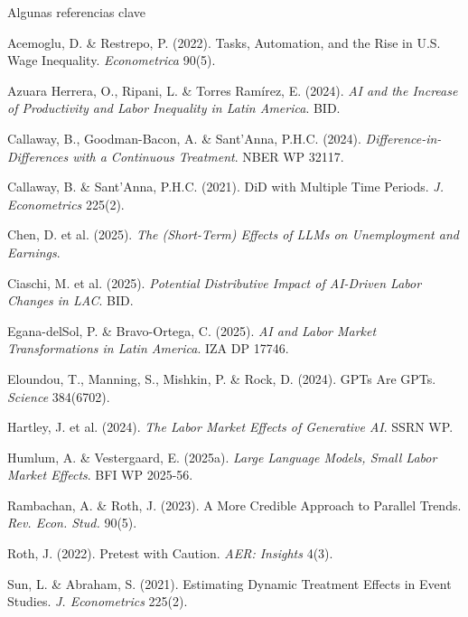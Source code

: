 \documentclass[aspectratio=169,11pt]{beamer}
\begin{document}
\begin{frame}{Algunas referencias clave}
\scriptsize
\setlength{\parskip}{0.30em}

Acemoglu, D. \& Restrepo, P. (2022). Tasks, Automation, and the Rise in U.S. Wage Inequality. \emph{Econometrica} 90(5).

Azuara Herrera, O., Ripani, L. \& Torres Ramírez, E. (2024). \emph{AI and the Increase of Productivity and Labor Inequality in Latin America}. BID.

Callaway, B., Goodman-Bacon, A. \& Sant'Anna, P.H.C. (2024). \emph{Difference-in-Differences with a Continuous Treatment}. NBER WP 32117.

Callaway, B. \& Sant'Anna, P.H.C. (2021). DiD with Multiple Time Periods. \emph{J. Econometrics} 225(2).

Chen, D. et al. (2025). \emph{The (Short-Term) Effects of LLMs on Unemployment and Earnings}.

Ciaschi, M. et al. (2025). \emph{Potential Distributive Impact of AI-Driven Labor Changes in LAC}. BID.

Egana-delSol, P. \& Bravo-Ortega, C. (2025). \emph{AI and Labor Market Transformations in Latin America}. IZA DP 17746.

Eloundou, T., Manning, S., Mishkin, P. \& Rock, D. (2024). GPTs Are GPTs. \emph{Science} 384(6702).

Hartley, J. et al. (2024). \emph{The Labor Market Effects of Generative AI}. SSRN WP.

Humlum, A. \& Vestergaard, E. (2025a). \emph{Large Language Models, Small Labor Market Effects}. BFI WP 2025-56.

Rambachan, A. \& Roth, J. (2023). A More Credible Approach to Parallel Trends. \emph{Rev. Econ. Stud.} 90(5).

Roth, J. (2022). Pretest with Caution. \emph{AER: Insights} 4(3).

Sun, L. \& Abraham, S. (2021). Estimating Dynamic Treatment Effects in Event Studies. \emph{J. Econometrics} 225(2).
\end{frame}

\end{document}

